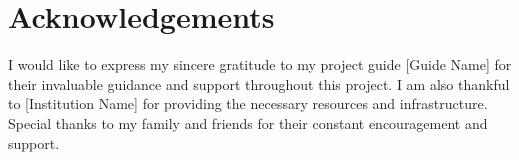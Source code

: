 \documentclass[12pt,a4paper]{report}
\begin{document}
\chapter*{Acknowledgements}
I would like to express my sincere gratitude to my project guide [Guide Name] for their invaluable guidance and support throughout this project. I am also thankful to [Institution Name] for providing the necessary resources and infrastructure. Special thanks to my family and friends for their constant encouragement and support.

\tableofcontents

\listoffigures

\listoftables





















\appendix



\end{document}
